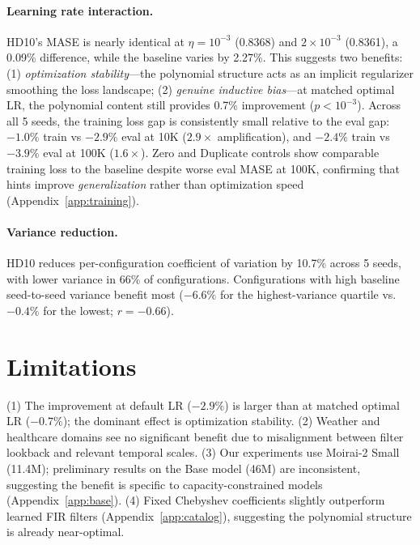 \documentclass{article}
\begin{document}
\paragraph{Learning rate interaction.} HD10's MASE is nearly identical at $\eta = 10^{-3}$ (0.8368) and $2 \times 10^{-3}$ (0.8361), a 0.09\% difference, while the baseline varies by 2.27\%. This suggests two benefits: (1) \emph{optimization stability}---the polynomial structure acts as an implicit regularizer smoothing the loss landscape; (2) \emph{genuine inductive bias}---at matched optimal LR, the polynomial content still provides 0.7\% improvement ($p < 10^{-3}$). Across all 5 seeds, the training loss gap is consistently small relative to the eval gap: $-1.0\%$ train vs $-2.9\%$ eval at 10K ($2.9\times$ amplification), and $-2.4\%$ train vs $-3.9\%$ eval at 100K ($1.6\times$). Zero and Duplicate controls show comparable training loss to the baseline despite worse eval MASE at 100K, confirming that hints improve \emph{generalization} rather than optimization speed (Appendix~\ref{app:training}).

\paragraph{Variance reduction.} HD10 reduces per-configuration coefficient of variation by 10.7\% across 5 seeds, with lower variance in 66\% of configurations. Configurations with high baseline seed-to-seed variance benefit most ($-6.6\%$ for the highest-variance quartile vs.\ $-0.4\%$ for the lowest; $r = -0.66$).

\section{Limitations}

(1) The improvement at default LR ($-2.9\%$) is larger than at matched optimal LR ($-0.7\%$); the dominant effect is optimization stability.
(2) Weather and healthcare domains see no significant benefit due to misalignment between filter lookback and relevant temporal scales.
(3) Our experiments use Moirai-2 Small (11.4M); preliminary results on the Base model (46M) are inconsistent, suggesting the benefit is specific to capacity-constrained models (Appendix~\ref{app:base}).
(4) Fixed Chebyshev coefficients slightly outperform learned FIR filters (Appendix~\ref{app:catalog}), suggesting the polynomial structure is already near-optimal.
\end{document}
